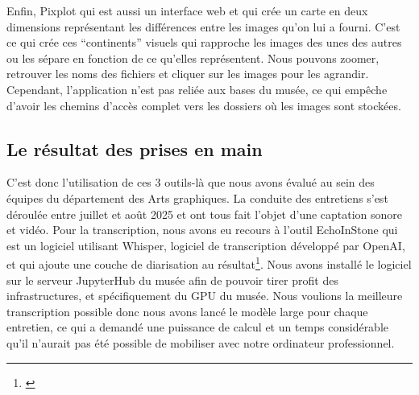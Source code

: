 Enfin, Pixplot qui est aussi un interface web et qui crée un carte en deux dimensions représentant les différences entre les images qu'on lui a fourni. C'est ce qui crée ces \enquote{continents} visuels qui rapproche les images des unes des autres ou les sépare en fonction de ce qu'elles représentent. Nous pouvons zoomer, retrouver les noms des fichiers et cliquer sur les images pour les agrandir. Cependant, l'application n'est pas reliée aux bases du musée, ce qui empêche d'avoir les chemins d'accès complet vers les dossiers où les images sont stockées.

\subsection{Le résultat des prises en main}

C'est donc l'utilisation de ces 3 outils-là que nous avons évalué au sein des équipes du département des Arts graphiques. La conduite des entretiens s'est déroulée entre juillet et août 2025 et ont tous fait l'objet d'une captation sonore et vidéo. Pour la transcription, nous avons eu recours à l'outil EchoInStone qui est un logiciel utilisant Whisper, logiciel de transcription développé par OpenAI, et qui ajoute une couche de diarisation au résultat\footnote{\cite{levy_jeanjeromeechoinstone_2025}}. Nous avons installé le logiciel sur le serveur JupyterHub du musée afin de pouvoir tirer profit des infrastructures, et spécifiquement du GPU du musée. Nous voulions la meilleure transcription possible donc nous avons lancé le modèle large pour chaque entretien, ce qui a demandé une puissance de calcul et un temps considérable qu'il n'aurait pas été possible de mobiliser avec notre ordinateur professionnel. 

